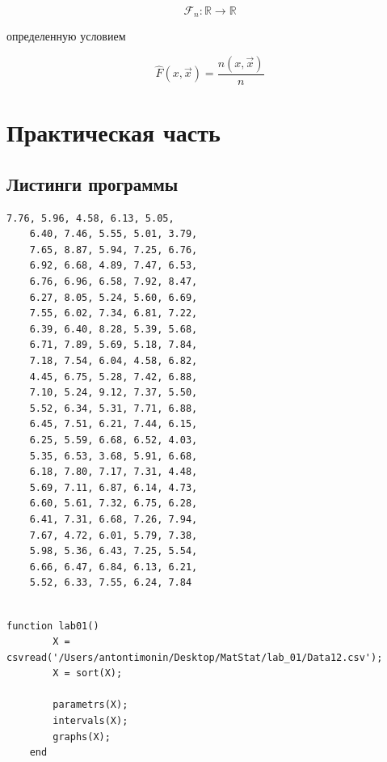 \documentclass[12pt, a4paper]{report}
\begin{document}
	\begin{equation*}
	\mathcal{F}_n: \mathbb{R} \to \mathbb{R}
	\end{equation*}
	
	\hspace{1cm} определенную условием
	
	\begin{equation*}
		\hat F(x, \vec{x}) = \frac{n(x, \vec{x})}{n}
	\end{equation*}
	
	
	\newpage
	
	\section{Практическая часть}
	
	\subsection{Листинги программы}
	\begin{lstlisting}[caption=Содержимое генеральной совокупности X]
	7.76, 5.96, 4.58, 6.13, 5.05,
	6.40, 7.46, 5.55, 5.01, 3.79,
	7.65, 8.87, 5.94, 7.25, 6.76,
	6.92, 6.68, 4.89, 7.47, 6.53,
	6.76, 6.96, 6.58, 7.92, 8.47,
	6.27, 8.05, 5.24, 5.60, 6.69,
	7.55, 6.02, 7.34, 6.81, 7.22, 
	6.39, 6.40, 8.28, 5.39, 5.68, 
	6.71, 7.89, 5.69, 5.18, 7.84, 
	7.18, 7.54, 6.04, 4.58, 6.82, 
	4.45, 6.75, 5.28, 7.42, 6.88, 
	7.10, 5.24, 9.12, 7.37, 5.50, 
	5.52, 6.34, 5.31, 7.71, 6.88, 
	6.45, 7.51, 6.21, 7.44, 6.15, 
	6.25, 5.59, 6.68, 6.52, 4.03, 
	5.35, 6.53, 3.68, 5.91, 6.68, 
	6.18, 7.80, 7.17, 7.31, 4.48, 
	5.69, 7.11, 6.87, 6.14, 4.73, 
	6.60, 5.61, 7.32, 6.75, 6.28, 
	6.41, 7.31, 6.68, 7.26, 7.94, 
	7.67, 4.72, 6.01, 5.79, 7.38, 
	5.98, 5.36, 6.43, 7.25, 5.54, 
	6.66, 6.47, 6.84, 6.13, 6.21, 
	5.52, 6.33, 7.55, 6.24, 7.84
	
	\end{lstlisting}
	
	\begin{lstlisting}[caption=Точка входа программы]
	function lab01()
		X = csvread('/Users/antontimonin/Desktop/MatStat/lab_01/Data12.csv');
		X = sort(X);
	
		parametrs(X);
		intervals(X);
		graphs(X); 
	end
	\end{lstlisting}
	
\end{document}
